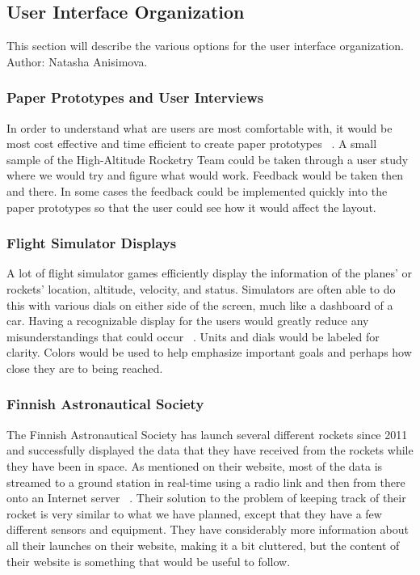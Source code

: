 \documentclass[10pt,draftclsnofoot,onecolumn]{IEEEtran}
\begin{document}
	
	\subsection{User Interface Organization}
	This section will describe the various options for the user interface organization. Author: Natasha Anisimova.
	
	\subsubsection{Paper Prototypes and User Interviews}
	In order to understand what are users are most comfortable with, it would be most cost effective and time efficient
	to create paper prototypes ~\cite{what-is-prototyping}. 
	A small sample of the High-Altitude Rocketry Team could be taken through a user study where we would try and figure
	what would work. 
	Feedback would be taken then and there.
	In some cases the feedback could be implemented quickly into the paper prototypes so that the user could see how it
	would affect the layout.
	
	\subsubsection{Flight Simulator Displays}
	A lot of flight simulator games efficiently display the information of the planes' or rockets' location, altitude,
	velocity, and status.
	Simulators are often able to do this with various dials on either side of the screen, much like a dashboard of a car.
	Having a recognizable display for the users would greatly reduce any misunderstandings that could occur ~\cite{flight-simulation-in-aerospace}. 
	Units and dials would be labeled for clarity. 
	Colors would be used to help emphasize important goals and perhaps how close they are to being reached.
	
	\subsubsection{Finnish Astronautical Society}
	The Finnish Astronautical Society has launch several different rockets since 2011 and successfully displayed the
	data that they have received from the rockets while they have been in space. 
	As mentioned on their website, most of the data is streamed to a ground station in real-time using a radio link and
	then from there onto an Internet server ~\cite{real-time-rocket-telementry-experiment}. 
	Their solution to the problem of keeping track of their rocket is very similar to what we have planned, except that they
	have a few different sensors and equipment.
	They have considerably more information about all their launches on their website, making it a bit cluttered, but the 
	content of their website is something that would be useful to follow.
	
\end{document}
